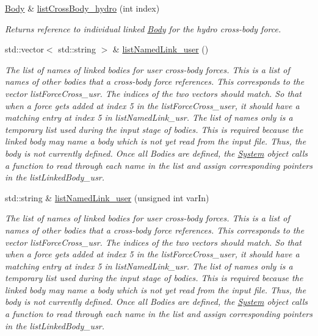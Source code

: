 \begin{DoxyCompactItemize}
\hyperlink{classosea_1_1ofreq_1_1_body}{Body} \& \hyperlink{classosea_1_1ofreq_1_1_body_a9aaac9391781c67198f7b8b5785d4745}{list\-Cross\-Body\-\_\-hydro} (int index)
\begin{DoxyCompactList}\small\item\em Returns reference to individual linked \hyperlink{classosea_1_1ofreq_1_1_body}{Body} for the hydro cross-\/body force. \end{DoxyCompactList}\item 
std\-::vector$<$ std\-::string $>$ \& \hyperlink{classosea_1_1ofreq_1_1_body_a07d8ed6fdf5a4c6ef73b2d39b58403ce}{list\-Named\-Link\-\_\-user} ()
\begin{DoxyCompactList}\small\item\em The list of names of linked bodies for user cross-\/body forces. This is a list of names of other bodies that a cross-\/body force references. This corresponds to the vector list\-Force\-Cross\-\_\-usr. The indices of the two vectors should match. So that when a force gets added at index 5 in the list\-Force\-Cross\-\_\-user, it should have a matching entry at index 5 in list\-Named\-Link\-\_\-usr. The list of names only is a temporary list used during the input stage of bodies. This is required because the linked body may name a body which is not yet read from the input file. Thus, the body is not currently defined. Once all Bodies are defined, the \hyperlink{classosea_1_1ofreq_1_1_system}{System} object calls a function to read through each name in the list and assign corresponding pointers in the list\-Linked\-Body\-\_\-usr. \end{DoxyCompactList}\item 
std\-::string \& \hyperlink{classosea_1_1ofreq_1_1_body_a1fd7e672b9768351f9a53523d7b5c798}{list\-Named\-Link\-\_\-user} (unsigned int var\-In)
\begin{DoxyCompactList}\small\item\em The list of names of linked bodies for user cross-\/body forces. This is a list of names of other bodies that a cross-\/body force references. This corresponds to the vector list\-Force\-Cross\-\_\-usr. The indices of the two vectors should match. So that when a force gets added at index 5 in the list\-Force\-Cross\-\_\-user, it should have a matching entry at index 5 in list\-Named\-Link\-\_\-usr. The list of names only is a temporary list used during the input stage of bodies. This is required because the linked body may name a body which is not yet read from the input file. Thus, the body is not currently defined. Once all Bodies are defined, the \hyperlink{classosea_1_1ofreq_1_1_system}{System} object calls a function to read through each name in the list and assign corresponding pointers in the list\-Linked\-Body\-\_\-usr. \end{DoxyCompactList}\item 

\end{DoxyCompactItemize}
